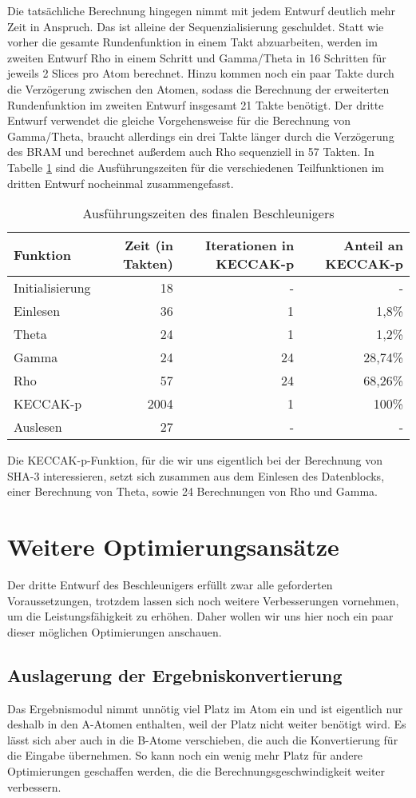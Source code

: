 Die tatsächliche Berechnung hingegen nimmt mit jedem Entwurf deutlich mehr Zeit in Anspruch. Das ist alleine der Sequenzialisierung geschuldet.
Statt wie vorher die gesamte Rundenfunktion in einem Takt abzuarbeiten, werden im zweiten Entwurf Rho in einem Schritt und Gamma/Theta in 16 Schritten für jeweils 2 Slices pro Atom berechnet.
Hinzu kommen noch ein paar Takte durch die Verzögerung zwischen den Atomen, sodass die Berechnung der erweiterten Rundenfunktion im zweiten Entwurf insgesamt 21 Takte benötigt.
Der dritte Entwurf verwendet die gleiche Vorgehensweise für die Berechnung von Gamma/Theta, braucht allerdings ein drei Takte länger durch die Verzögerung des BRAM
und berechnet außerdem auch Rho sequenziell in 57 Takten. In Tabelle \ref{tab:zeiten_iteration_3} sind die Ausführungszeiten
für die verschiedenen Teilfunktionen im dritten Entwurf nocheinmal zusammengefasst.
\begin{table}
    \centering
    \begin{tabular}{lrrr}
    Funktion & Zeit (in Takten) & Iterationen in KECCAK-p & Anteil an KECCAK-p \\
    \hline
    Initialisierung & 18 & - & - \\
    Einlesen & 36 & 1 & 1,8\% \\
    Theta & 24 & 1 & 1,2\% \\
    Gamma & 24 & 24 & 28,74\% \\
    Rho & 57 & 24 & 68,26\% \\
    KECCAK-p & 2004 & 1 & 100\% \\
    Auslesen & 27 & - & -
    \end{tabular}
    \label{tab:zeiten_iteration_3}
    \caption{Ausführungszeiten des finalen Beschleunigers}
\end{table}
Die KECCAK-p-Funktion, für die wir uns eigentlich bei der Berechnung von SHA-3 interessieren, setzt sich zusammen aus dem Einlesen des Datenblocks,
einer Berechnung von Theta, sowie 24 Berechnungen von Rho und Gamma.

\section{Weitere Optimierungsansätze}
Der dritte Entwurf des Beschleunigers erfüllt zwar alle geforderten Voraussetzungen, trotzdem lassen sich noch weitere Verbesserungen vornehmen, um die Leistungsfähigkeit zu erhöhen.
Daher wollen wir uns hier noch ein paar dieser möglichen Optimierungen anschauen.

\subsection{Auslagerung der Ergebniskonvertierung}
Das Ergebnismodul nimmt unnötig viel Platz im Atom ein und ist eigentlich nur deshalb in den A-Atomen enthalten, weil der Platz nicht weiter benötigt wird.
Es lässt sich aber auch in die B-Atome verschieben, die auch die Konvertierung für die Eingabe übernehmen.
So kann noch ein wenig mehr Platz für andere Optimierungen geschaffen werden, die die Berechnungsgeschwindigkeit weiter verbessern.

